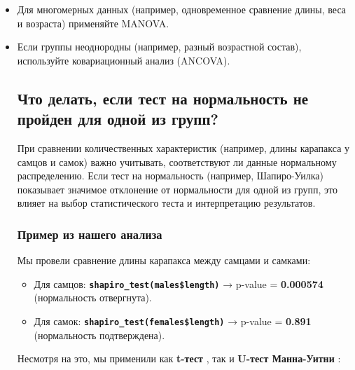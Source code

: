 \documentclass[
  letterpaper,
  DIV=11,
  numbers=noendperiod]{scrreprt}
\begin{document}
\begin{itemize}
\item
  Для многомерных данных (например, одновременное сравнение длины, веса
  и возраста) применяйте MANOVA.
\item
  Если группы неоднородны (например, разный возрастной состав),
  используйте ковариационный анализ (ANCOVA).

  \subsection{\texorpdfstring{\textbf{Что делать, если тест на
  нормальность не пройден для одной из
  групп?}}{Что делать, если тест на нормальность не пройден для одной из групп?}}\label{ux447ux442ux43e-ux434ux435ux43bux430ux442ux44c-ux435ux441ux43bux438-ux442ux435ux441ux442-ux43dux430-ux43dux43eux440ux43cux430ux43bux44cux43dux43eux441ux442ux44c-ux43dux435-ux43fux440ux43eux439ux434ux435ux43d-ux434ux43bux44f-ux43eux434ux43dux43eux439-ux438ux437-ux433ux440ux443ux43fux43f}

  При сравнении количественных характеристик (например, длины карапакса
  у самцов и самок) важно учитывать, соответствуют ли данные нормальному
  распределению. Если тест на нормальность (например, Шапиро-Уилка)
  показывает значимое отклонение от нормальности для одной из групп, это
  влияет на выбор статистического теста и интерпретацию результатов.

  \subsubsection{\texorpdfstring{\textbf{Пример из нашего
  анализа}}{Пример из нашего анализа}}\label{ux43fux440ux438ux43cux435ux440-ux438ux437-ux43dux430ux448ux435ux433ux43e-ux430ux43dux430ux43bux438ux437ux430}

  Мы провели сравнение длины карапакса между самцами и самками:

  \begin{itemize}
  \item
    Для самцов: \textbf{\texttt{shapiro\_test(males\$length)}} → p-value
    = \textbf{0.000574} (нормальность отвергнута).
  \item
    Для самок: \textbf{\texttt{shapiro\_test(females\$length)}} →
    p-value = \textbf{0.891} (нормальность подтверждена).
  \end{itemize}

  Несмотря на это, мы применили как \textbf{t-тест} , так и
  \textbf{U-тест Манна-Уитни} :


\end{itemize}
\end{document}
